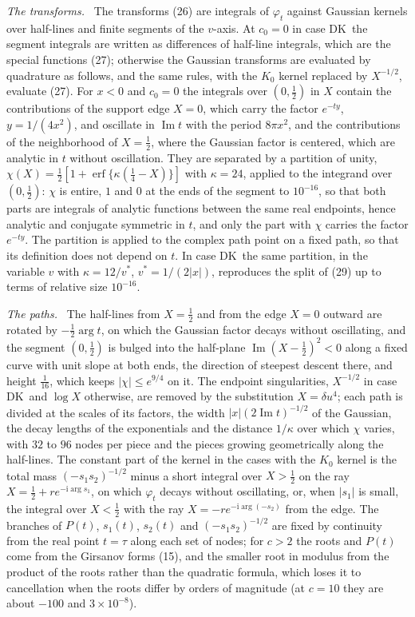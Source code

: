 \documentclass[ecta,nameyear,final,supplement]{econsocart}
\newcommand{\iu}{{\mathrm i}}
\newcommand{\Ima}{\operatorname{Im}}
\newcommand{\erf}{\operatorname{erf}}
\newcommand{\Fk}{\textsf{\upshape DK}}
\theoremstyle{plain}
\theoremstyle{definition}
\newcommand{\runin}[1]{\par\medskip\noindent\textit{#1.}\ \ignorespaces}
\begin{document}
\runin{The transforms}  The transforms (26) are integrals of $\varphi_t$ against Gaussian kernels over half-lines and finite segments of the $v$-axis.  At $c_0=0$ in case \Fk\ the segment integrals are written as differences of half-line integrals, which are the special functions (27); otherwise the Gaussian transforms are evaluated by quadrature as follows, and the same rules, with the $K_0$ kernel replaced by $X^{-1/2}$, evaluate (27).  For $x<0$ and $c_0=0$ the integrals over $(0,\frac12)$ in $X$ contain the contributions of the support edge $X=0$, which carry the factor $e^{-ty}$, $y=1/(4x^2)$, and oscillate in $\Ima t$ with the period $8\pi x^2$, and the contributions of the neighborhood of $X=\frac12$, where the Gaussian factor is centered, which are analytic in $t$ without oscillation.  They are separated by a partition of unity, $\chi(X)=\frac12[1+\erf\{\kappa(\frac14-X)\}]$ with $\kappa=24$, applied to the integrand over $(0,\frac12)$: $\chi$ is entire, $1$ and $0$ at the ends of the segment to $10^{-16}$, so that both parts are integrals of analytic functions between the same real endpoints, hence analytic and conjugate symmetric in $t$, and only the part with $\chi$ carries the factor $e^{-ty}$.  The partition is applied to the complex path point on a fixed path, so that its definition does not depend on $t$.  In case \Fk\ the same partition, in the variable $v$ with $\kappa=12/v^*$, $v^*=1/(2|x|)$, reproduces the split of (29) up to terms of relative size $10^{-16}$.

\runin{The paths}  The half-lines from $X=\frac12$ and from the edge $X=0$ outward are rotated by $-\frac12\arg t$, on which the Gaussian factor decays without oscillating, and the segment $(0,\frac12)$ is bulged into the half-plane $\Ima(X-\frac12)^2<0$ along a fixed curve with unit slope at both ends, the direction of steepest descent there, and height $\frac1{16}$, which keeps $|\chi|\le e^{9/4}$ on it.  The endpoint singularities, $X^{-1/2}$ in case \Fk\ and $\log X$ otherwise, are removed by the substitution $X=\delta u^4$; each path is divided at the scales of its factors, the width $|x|(2\Ima t)^{-1/2}$ of the Gaussian, the decay lengths of the exponentials and the distance $1/\kappa$ over which $\chi$ varies, with $32$ to $96$ nodes per piece and the pieces growing geometrically along the half-lines.  The constant part of the kernel in the cases with the $K_0$ kernel is the total mass $(-s_1s_2)^{-1/2}$ minus a short integral over $X>\frac12$ on the ray $X=\frac12+re^{-\iu\arg s_1}$, on which $\varphi_t$ decays without oscillating, or, when $|s_1|$ is small, the integral over $X<\frac12$ with the ray $X=-re^{-\iu\arg(-s_2)}$ from the edge.  The branches of $P(t)$, $s_1(t)$, $s_2(t)$ and $(-s_1s_2)^{-1/2}$ are fixed by continuity from the real point $t=\tau$ along each set of nodes; for $c>2$ the roots and $P(t)$ come from the Girsanov forms (15), and the smaller root in modulus from the product of the roots rather than the quadratic formula, which loses it to cancellation when the roots differ by orders of magnitude (at $c=10$ they are about $-100$ and $3\times10^{-8}$).
\end{document}
